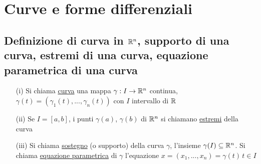 \section{Curve e forme differenziali}
\subsection{ Definizione di curva in $\mathbb{R}^n$, supporto di una curva, estremi di una
curva, equazione parametrica di una curva}
\begin{definition}
  \begin{itemize}
    \item[(i)] Si chiama \underline{curva} una mappa $\gamma:I \to \mathbb{R}^n$ continua, 
                $\gamma(t) = (\gamma_1(t),...,\gamma_n(t))$
                con $I$ intervallo di $\mathbb{R}$
    \item[(ii)] Se $I = [a,b]$, i punti $\gamma(a)$, $\gamma(b)$ di $\mathbb{R}^n$ si chiamano
                \underline{estremi} della curva
    \item[(iii)] Si chiama \underline{sostegno} (o supporto) della curva $\gamma$, l'insieme 
                  $\gamma(I) \subseteq \mathbb{R}^n$. Si chiama \underline{equazione parametrica} di $\gamma$ 
                  l'equazione $x = (x_1,...,x_n) = \gamma(t) \, t \in I$
  \end{itemize}
\end{definition}
